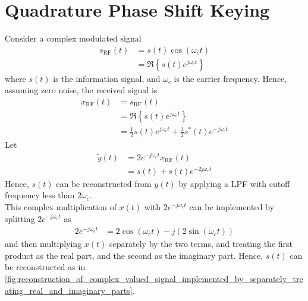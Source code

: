 \documentclass[titlepage, fleqn, a4paper, 12pt, twoside]{article}
\theoremstyle{definition}
\theoremstyle{theorem}
\renewcommand{\tilde}{\widetilde}
\begin{document}
\section{Quadrature Phase Shift Keying}

Consider a complex modulated signal
\begin{align*}
	s_{\text{RF}}(t) &= s(t) \cos(\omega_c t)\\
	&= \Re\left\{ s(t) e^{j \omega_c t} \right\}
\end{align*}
where $s(t)$ is the information signal, and $\omega_c$ is the carrier frequency.
Hence, assuming zero noise, the received signal is
\begin{align*}
	x_{\text{RF}}(t) &= s_{\text{RF}}(t)\\
	&= \Re\left\{ s(t) e^{j \omega_c t} \right\}\\
	&= \frac{1}{2} s(t) e^{j \omega_c t} + \frac{1}{2} s^*(t) e^{-j \omega_c t}
\end{align*}
Let
\begin{align*}
	\tilde{y}(t) &= 2 e^{-j \omega_c t} x_{\text{RF}}(t)\\
	&= s(t) + s(t) e^{-2 j \omega_c t}
\end{align*}
Hence, $s(t)$ can be reconstructed from $y(t)$ by applying a LPF with cutoff frequency less than $2 \omega_c$.\\
This complex multiplication of $x(t)$ with $2 e^{-j \omega_c t}$ can be implemented by splitting $2 e^{-j \omega_c t}$ as
\begin{align*}
	2 e^{-j \omega_c t} &= 2 \cos(\omega_c t) - j \left( 2 \sin(\omega_c t) \right)
\end{align*}
and then multiplying $x(t)$ separately by the two terms, and treating the first product as the real part, and the second as the imaginary part.
Hence, $s(t)$ can be reconstructed as in \cref{fig:reconstruction_of_complex_valued_signal_implemented_by_separately_treating_real_and_imaginary_parts}.
\end{document}
